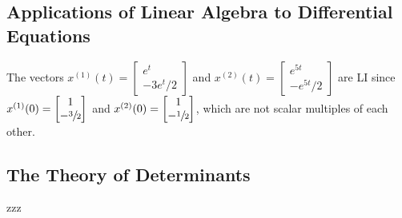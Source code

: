 \subsection{Applications of Linear Algebra to Differential Equations}
\begin{example}
    The vectors $x^{(1)}(t)=
    \begin{bmatrix}
        e^{t}\\
        -3e^{t} /2
    \end{bmatrix}$ and $x^{(2)}(t)=
    \begin{bmatrix}
        e^{5t}\\
        -e^{5t}/2
    \end{bmatrix}$ are LI since $x^{(1)}(0)=
    \begin{bmatrix}
        1\\
        -\sfrac{3}{2}
    \end{bmatrix}$ and $x^{(2)}(0)=
    \begin{bmatrix}
        1\\
        -\sfrac{1}{2}
    \end{bmatrix}$, which are not scalar multiples of each other.
\end{example}

\subsection{The Theory of Determinants}
zzz

